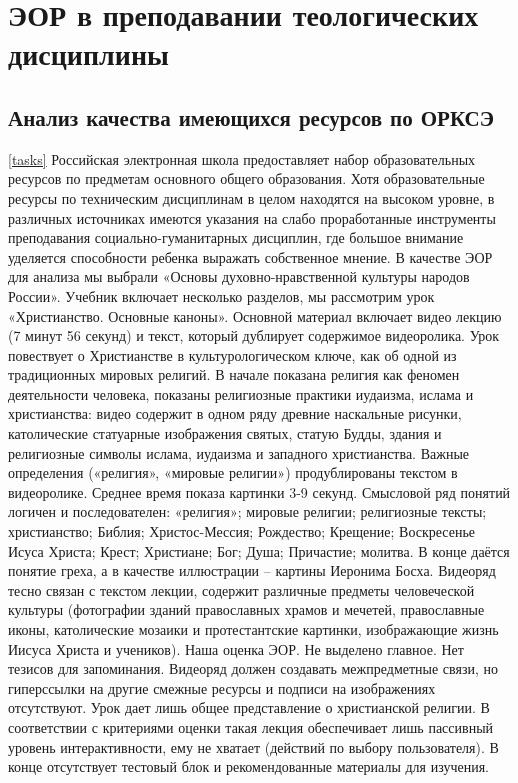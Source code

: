 \section{ЭОР в преподавании теологических дисциплины}

\subsection{Анализ качества имеющихся ресурсов по ОРКСЭ}
\ref{tasks}
Российская электронная школа предоставляет набор образовательных ресурсов по предметам основного общего образования. Хотя образовательные ресурсы по техническим дисциплинам в целом находятся на высоком уровне, в различных источниках имеются указания на слабо проработанные инструменты преподавания социально-гуманитарных дисциплин, где большое внимание уделяется способности ребенка выражать собственное мнение.\cite{lastochkin19}
В качестве ЭОР для анализа мы выбрали «Основы духовно-нравственной культуры народов России». Учебник включает несколько разделов, мы рассмотрим урок «Христианство. Основные каноны»\cite{sample}. Основной материал включает видео лекцию (7 минут 56 секунд) и текст, который дублирует содержимое видеоролика. Урок повествует о Христианстве в культурологическом ключе, как об одной из традиционных мировых религий.
В начале показана религия как феномен деятельности человека, показаны религиозные практики иудаизма, ислама и христианства: видео содержит в одном ряду древние наскальные рисунки, католические статуарные изображения святых, статую Будды, здания и религиозные символы ислама, иудаизма и западного христианства. Важные определения («религия», «мировые религии») продублированы текстом в видеоролике. Среднее время показа картинки 3-9 секунд.
Смысловой ряд понятий логичен и последователен: «религия»; мировые религии; религиозные тексты; христианство; Библия; Христос-Мессия; Рождество; Крещение; Воскресенье Исуса Христа; Крест; Христиане; Бог; Душа; Причастие; молитва. В конце даётся понятие греха, а в качестве иллюстрации – картины Иеронима Босха.
Видеоряд тесно связан с текстом лекции, содержит различные предметы человеческой культуры (фотографии зданий православных храмов и мечетей, православные иконы, католические мозаики и протестантские картинки, изображающие жизнь Иисуса Христа и учеников).
Наша оценка ЭОР. Не выделено главное. Нет тезисов для запоминания. Видеоряд должен создавать межпредметные связи, но гиперссылки на другие смежные ресурсы и подписи на изображениях отсутствуют. Урок дает лишь общее представление о христианской религии. В соответствии с критериями оценки такая лекция обеспечивает лишь пассивный уровень интерактивности, ему не хватает (действий по выбору пользователя). В конце отсутствует тестовый блок и рекомендованные материалы для изучения.
